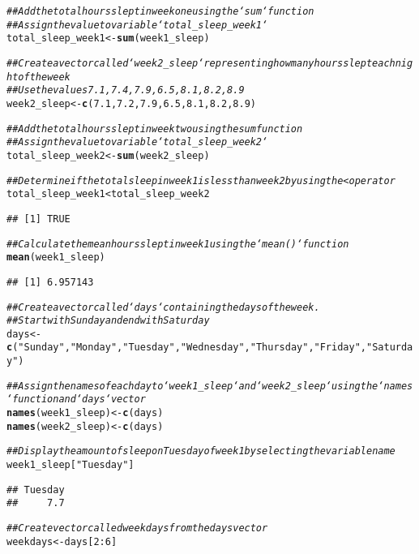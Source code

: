 \documentclass{article}\usepackage[]{graphicx}\usepackage[]{xcolor}
\makeatletter
\newcommand{\hlnum}[1]{\textcolor[rgb]{0.686,0.059,0.569}{#1}}%
\newcommand{\hlstr}[1]{\textcolor[rgb]{0.192,0.494,0.8}{#1}}%
\newcommand{\hlcom}[1]{\textcolor[rgb]{0.678,0.584,0.686}{\textit{#1}}}%
\newcommand{\hlopt}[1]{\textcolor[rgb]{0,0,0}{#1}}%
\newcommand{\hlstd}[1]{\textcolor[rgb]{0.345,0.345,0.345}{#1}}%
\newcommand{\hlkwb}[1]{\textcolor[rgb]{0.69,0.353,0.396}{#1}}%
\newcommand{\hlkwd}[1]{\textcolor[rgb]{0.737,0.353,0.396}{\textbf{#1}}}%
\newenvironment{kframe}{%
 \def\at@end@of@kframe{}%
 \ifinner\ifhmode%
  \def\at@end@of@kframe{\end{minipage}}%
  \begin{minipage}{\columnwidth}%
 \fi\fi%
 \def\FrameCommand##1{\hskip\@totalleftmargin \hskip-\fboxsep
 \colorbox{shadecolor}{##1}\hskip-\fboxsep
     \hskip-\linewidth \hskip-\@totalleftmargin \hskip\columnwidth}%
 \MakeFramed {\advance\hsize-\width
   \@totalleftmargin\z@ \linewidth\hsize
   \@setminipage}}%
 {\par\unskip\endMakeFramed%
 \at@end@of@kframe}
\newenvironment{knitrout}{}{} %
\makeatother
\begin{document}
\begin{knitrout}
\begin{kframe}
\begin{alltt}
\hlcom{## Add the total hours slept in week one using the `sum` function}
\hlcom{## Assign the value to variable `total_sleep_week1`}
\hlstd{total_sleep_week1} \hlkwb{<-} \hlkwd{sum}\hlstd{(week1_sleep)}

\hlcom{## Create a vector called `week2_sleep` representing how many hours slept each night of the week}
\hlcom{## Use the values 7.1, 7.4, 7.9, 6.5, 8.1, 8.2, 8.9}
\hlstd{week2_sleep} \hlkwb{<-} \hlkwd{c}\hlstd{(}\hlnum{7.1}\hlstd{,} \hlnum{7.2}\hlstd{,} \hlnum{7.9}\hlstd{,} \hlnum{6.5}\hlstd{,} \hlnum{8.1}\hlstd{,} \hlnum{8.2}\hlstd{,} \hlnum{8.9}\hlstd{)}

\hlcom{## Add the total hours slept in week two using the sum function}
\hlcom{## Assign the value to variable `total_sleep_week2`}
\hlstd{total_sleep_week2} \hlkwb{<-} \hlkwd{sum}\hlstd{(week2_sleep)}

\hlcom{## Determine if the total sleep in week 1 is less than week 2 by using the < operator}
\hlstd{total_sleep_week1} \hlopt{<} \hlstd{total_sleep_week2}
\end{alltt}
\begin{verbatim}
## [1] TRUE
\end{verbatim}
\begin{alltt}
\hlcom{## Calculate the mean hours slept in week 1 using the `mean()` function}
\hlkwd{mean}\hlstd{(week1_sleep)}
\end{alltt}
\begin{verbatim}
## [1] 6.957143
\end{verbatim}
\begin{alltt}
\hlcom{## Create a vector called `days` containing the days of the week.}
\hlcom{## Start with Sunday and end with Saturday}
\hlstd{days} \hlkwb{<-} \hlkwd{c}\hlstd{(}\hlstr{"Sunday"}\hlstd{,} \hlstr{"Monday"}\hlstd{,} \hlstr{"Tuesday"}\hlstd{,} \hlstr{"Wednesday"}\hlstd{,} \hlstr{"Thursday"}\hlstd{,} \hlstr{"Friday"}\hlstd{,} \hlstr{"Saturday"}\hlstd{)}

\hlcom{## Assign the names of each day to `week1_sleep` and `week2_sleep` using the `names` function and `days` vector}
\hlkwd{names}\hlstd{(week1_sleep)} \hlkwb{<-} \hlkwd{c}\hlstd{(days)}
\hlkwd{names}\hlstd{(week2_sleep)} \hlkwb{<-} \hlkwd{c}\hlstd{(days)}

\hlcom{## Display the amount of sleep on Tuesday of week 1 by selecting the variable name}
\hlstd{week1_sleep[}\hlstr{"Tuesday"}\hlstd{]}
\end{alltt}
\begin{verbatim}
## Tuesday 
##     7.7
\end{verbatim}
\begin{alltt}
\hlcom{## Create vector called weekdays from the days vector}
\hlstd{weekdays} \hlkwb{<-} \hlstd{days[}\hlnum{2}\hlopt{:}\hlnum{6}\hlstd{]}


\end{alltt}
\end{kframe}
\end{knitrout}
\end{document}

